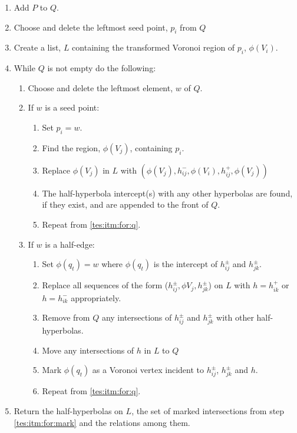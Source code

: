 \begin{enumerate}
  \item Add $P$ to $Q$.
  \item Choose and delete the leftmost seed point, $p_i$ from $Q$
  \item Create a list, $L$ containing the transformed Voronoi region of $p_i$, $\phi(V_i)$.
  \item\label{tes:itm:for:q} While $Q$ is not empty do the following:
  \begin{enumerate}
    \item Choose and delete the leftmost element, $w$ of $Q$.
    \item If $w$ is a seed point:
    \begin{enumerate}
      \item Set $p_i=w$.
      \item Find the region, $\phi(V_j)$, containing $p_i$.
      \item Replace $\phi(V_j)$ in $L$ with $(\phi(V_j),h^-_{ij},\phi(V_i),h^+_{ij},\phi(V_j))$
      \item The half-hyperbola intercept(s) with any other hyperbolas are found, if they exist, and are appended to the front of $Q$.
      \item Repeat from \ref{tes:itm:for:q}.
    \end{enumerate}
    \item If $w$ is a half-edge:
    \begin{enumerate}
      \item Set $\phi(q_t)=w$ where $\phi(q_t)$ is the intercept of $h^\pm_{ij}$ and $h^\pm_{jk}$.
      \item Replace all sequences of the form ($h^\pm_{ij},\phi{V_j},h^\pm_{jk}$) on $L$ with $h=h^+_{ik}$ or $h=h^-_{ik}$ appropriately.
      \item Remove from $Q$ any intersections of $h^\pm_{ij}$ and $h^\pm_{jk}$ with other half-hyperbolas.
      \item Move any intersections of $h$ in $L$ to $Q$
      \item\label{tes:itm:for:mark} Mark $\phi(q_t)$ as a Voronoi vertex incident to $h^\pm_{ij}$, $h^\pm_{jk}$ and $h$.
      \item Repeat from \ref{tes:itm:for:q}.
    \end{enumerate}
  \end{enumerate}
  \item Return the half-hyperbolas on $L$, the set of marked intersections from step \ref{tes:itm:for:mark} and the relations among them.
\end{enumerate}
